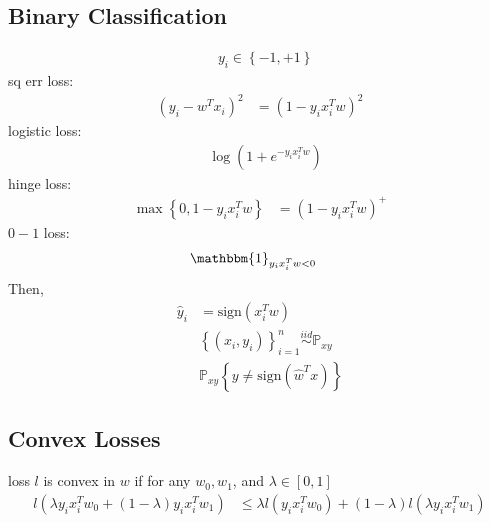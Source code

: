 \documentclass{article}
\begin{document}
\subsection{Binary Classification}
\begin{align*}
&y_{i} \in \left\{-1, +1\right\}
\end{align*}
sq err loss:
\begin{align*}
\left(y_{i} - w^{T} x_{i}\right)^{2} &= \left(1 - y_{i} x_{i}^{T} w\right)^{2}
\end{align*}
logistic loss:
\begin{align*}
&\log\left(1 + e^{- y_{i} x_{i}^{T} w}\right)
\end{align*}
hinge loss:
\begin{align*}
\displaystyle\max\left\{0, 1 - y_{i} x_{i}^{T} w\right\} &= \left(1 - y_{i} x_{i}^{T} w\right)^{+}
\end{align*}
$0-1$ loss:
\begin{align*}
&\mathbbm{1}_{y_{i} x_{i}^{T} w < 0}
\end{align*}
Then,
\begin{align*}
\hat{y}_{i} &= \text{sign}\left(x_{i}^{T} w \right)
\\ &  \left\{\left(x_{i}, y_{i}\right)\right\}_{i=1}^{n} \stackrel{iid}{\sim} \mathbb{P}_{xy}
\\ &  \mathbb{P}_{xy} \left\{y \neq  \text{sign}\left(\hat{w}^{T} x\right)\right\}
\end{align*}


\subsection{Convex Losses}
loss $l $ is convex in $w $ if for any $w_{0}, w_{1}$, and $\lambda \in \left[0, 1\right]$
\begin{align*}
l\left(\lambda y_{i} x_{i}^{T} w_{0} + \left(1 - \lambda\right) y_{i} x_{i}^{T} w_{1}\right)  &\leq  \lambda l\left(y_{i} x_{i}^{T} w_{0}\right)  + \left(1 - \lambda\right) l\left(\lambda y_{i} x_{i}^{T} w_{1}\right) 
\end{align*}
\end{document}
